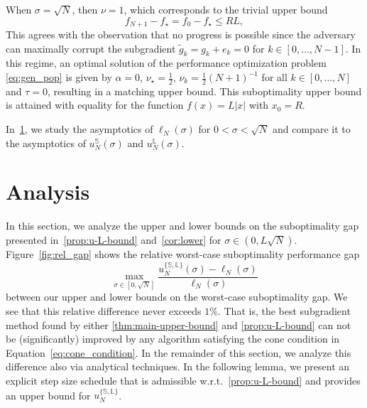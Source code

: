 \documentclass{article}
\begin{document}
When $\sigma = \sqrt{N}$, then $\nu=1$, which corresponds to the trivial upper bound
\[
  f_{N+1}-f_\star = f_0 - f_\star \leq RL,
\]
This agrees with the observation that no progress is possible since the adversary can maximally corrupt the subgradient $\tilde g_k = g_k+e_k=0$ for $k\in [0, \dots, N-1]$. In this regime, an optimal solution of the performance optimization problem \eqref{eq:gen_pop} is given by  $\alpha=0$, $\nu_\star=\frac12$, $\nu_k=\frac12(N+1)^{-1}$ for all $k\in [0, \dots, N]$ and $\tau=0$, resulting in a matching upper bound.
This suboptimality upper bound is attained with equality for the function $f(x)=L|x|$ with $x_0=R$.

In~\cref{sec:analysis}, we study the asymptotics of $\ell_N(\sigma)$ for $0<\sigma<\sqrt N$ and compare it to the asymptotics of $u^{\mathbb S}_N(\sigma)$ and $u^{\mathbb L}_N(\sigma)$.

\section{Analysis}\label{sec:analysis}
In this section, we analyze the upper and lower bounds on the suboptimality gap presented in~\cref{prop:u-L-bound} and~\cref{cor:lower} for $\sigma\in(0,L\sqrt N)$. 
Figure~\ref{fig:rel_gap} shows the relative worst-case suboptimality performance gap 
\begin{equation}
  \label{eq:relative-gap}
  \max_{\sigma\in [0, \sqrt{N}]}\frac{u_N^{\{\mathbb S, \mathbb L\}}(\sigma)-\ell_N(\sigma)}{\ell_N(\sigma)}
\end{equation}
between our upper and lower bounds on the worst-case suboptimality gap. We see that this relative difference never exceeds $1\%$. That is, the best subgradient method found by either \cref{thm:main-upper-bound} and \cref{prop:u-L-bound} can not be (significantly) improved by any algorithm satisfying the cone condition in Equation~\eqref{eq:cone_condition}. In the remainder of this section, we analyze this difference also via analytical techniques.
In the following lemma, we present an explicit step size schedule that is admissible w.r.t.~\cref{prop:u-L-bound} and provides an upper bound for $u_N^{\{\mathbb S, \mathbb L\}}$.

\end{document}
